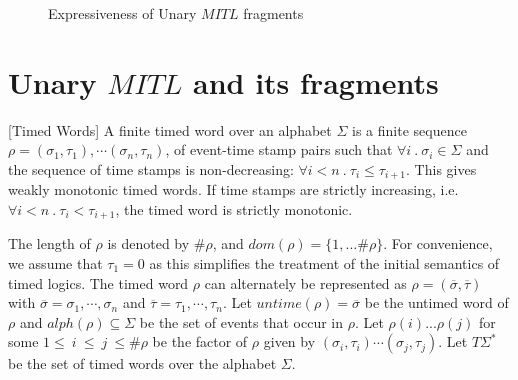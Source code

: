 \documentclass{llncs}
\newcommand{\fut}{\textsf{F}}
\newcommand{\past}{\textsf{P}}
\newcommand{\mitlfp}{\mbox{$\mathit{MITL[\fut_I,\past_I]}$}}
\newcommand{\bmitlfp}{\mbox{$\mathit{Bounded ~MITL[\fut_b,\past_b]}$}}
\newcommand{\potdta}{\mbox{$\mathit{po2DTA}$}}
\newcommand{\ttl}{\mbox{$\mathit{TTL[X_\theta, Y_\theta]}$}}
\newcommand{\mitlfpinf}{\mbox{$\mathit{MITL[\fut_\infty,\past_\infty]}$}}
\newcommand{\mitlfpb}{\bmitlfp}
\newcommand{\mitl}{\mbox{$\mathit{MITL}$}}
\newcommand{\mitlfpzinf}{\mbox{$\mathit{MITL[\fut_{0,\infty},\past_{0,\infty}]}$}}
\begin{document}
\begin{figure}
\caption{Expressiveness of Unary \mitl\/ fragments}
\label{fig:unaryexpress}
\end{figure}


\section{Unary \mitl\/ and its fragments}
\label{sec:mitlsem}
\begin{definition}{[Timed Words]}
A finite timed word over an alphabet $\Sigma$ is a finite sequence $\rho = (\sigma_1,\tau_1), \cdots (\sigma_n,\tau_n)$, of event-time stamp pairs 
such that $\forall i ~.~ \sigma_i\in \Sigma$ and the 
sequence of time stamps is non-decreasing: $\forall i<n ~.~ \tau_i\leq \tau_{i+1}$. This gives weakly monotonic timed words. If
time stamps are strictly increasing, i.e. $\forall i<n ~.~ \tau_i< \tau_{i+1}$, the timed word is strictly monotonic.
\end{definition}
The length of $\rho$ is denoted by $\#\rho$, and $dom(\rho) =
\{1,...\#\rho\}$. For convenience, we assume  that $\tau_1 = 0$ as
this simplifies the treatment of the initial semantics of timed logics. The timed word $\rho$ can alternately be represented as 
$\rho=(\overline{\sigma},\overline{\tau})$ with $\overline{\sigma} = \sigma_1, \cdots, \sigma_n$ and 
$\overline{\tau} = \tau_1, \cdots,\tau_n$. Let
$untime(\rho)=\overline{\sigma}$ be the untimed word of $\rho$ and $alph(\rho)\subseteq\Sigma$ be the set of events that occur in $\rho$. Let $\rho(i)...\rho(j)$ for some $1\leq~ i~\leq~j ~\leq \#\rho$ be the factor of $\rho$ given by $(\sigma_i,\tau_i)\cdots(\sigma_j,\tau_j)$.
Let $T\Sigma^*$ be the set of timed words over the alphabet $\Sigma$.
\end{document}
